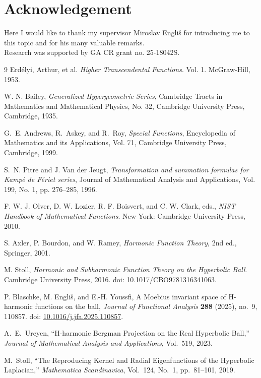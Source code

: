\documentclass{article}
\theoremstyle{boldremark}
\renewcommand\[{\begin{equation}}
\renewcommand\]{\end{equation}}
\theoremstyle{definition}
\numberwithin{equation}{section}
\begin{document}
\section{Acknowledgement}
Here I would like to thank my supervisor Miroslav Engliš for introducing me to this topic and for his many valuable remarks. \\Research was supported by GA CR grant no. 25-18042S.
\begin{thebibliography}{9}
  Erdélyi, Arthur, et al. 
  \textit{Higher Transcendental Functions}. Vol. 1. 
  McGraw-Hill, 1953.

W. N. Bailey,
\textit{Generalized Hypergeometric Series},
Cambridge Tracts in Mathematics and Mathematical Physics, No. 32,
Cambridge University Press, Cambridge, 1935.

  G.~E. Andrews, R.~Askey, and R.~Roy,
  \textit{Special Functions},
  Encyclopedia of Mathematics and its Applications, Vol. 71,
  Cambridge University Press, Cambridge, 1999.
  
  S.~N. Pitre and J. Van der Jeugt,
  \textit{Transformation and summation formulas for Kamp{\'e} de F{\'e}riet series},
  Journal of Mathematical Analysis and Applications,
  Vol. 199, No. 1, pp. 276--285, 1996.

  
F. W. J. Olver, D. W. Lozier, R. F. Boisvert, and C. W. Clark, eds.,
\textit{NIST Handbook of Mathematical Functions}.
New York: Cambridge University Press, 2010.

S. Axler, P. Bourdon, and W. Ramey,
\emph{Harmonic Function Theory},
2nd ed., Springer, 2001.

M. Stoll,
\textit{Harmonic and Subharmonic Function Theory on the Hyperbolic Ball}.
Cambridge University Press, 2016.
doi: 10.1017/CBO9781316341063.

P. Blaschke, M. Engli\v{s}, and E.-H. Youssfi,
A Moebius invariant space of H-harmonic functions on the ball,
\emph{Journal of Functional Analysis} \textbf{288} (2025), no.~9, 110857.
doi: \href{https://doi.org/10.1016/j.jfa.2025.110857}{10.1016/j.jfa.2025.110857}.

A.~E.~Ureyen,
``H-harmonic Bergman Projection on the Real Hyperbolic Ball,''
\emph{Journal of Mathematical Analysis and Applications},
Vol.~519, 2023.

M.~Stoll,
``The Reproducing Kernel and Radial Eigenfunctions of the Hyperbolic Laplacian,''
\emph{Mathematica Scandinavica},
Vol.~124, No.~1, pp.~81--101, 2019.


\end{thebibliography}
\end{document}
